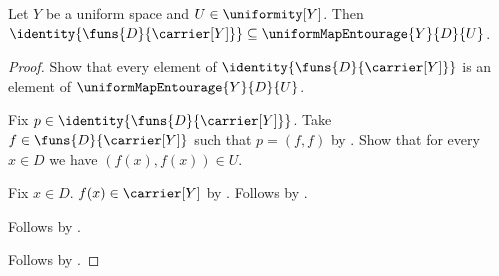\begin{proposition}\label{uniform_map_entourage_diagonal}
    Let $Y$ be a uniform space and $U\in\uniformity[Y]$.
    Then $\identity{\funs{D}{\carrier[Y]}}\subseteq
        \uniformMapEntourage{Y}{D}{U}$.
\end{proposition}
\begin{proof}
    Show that every element of $\identity{\funs{D}{\carrier[Y]}}$ is an
        element of $\uniformMapEntourage{Y}{D}{U}$.
    \begin{subproof}
        Fix $p\in\identity{\funs{D}{\carrier[Y]}}$.
        Take $f\in\funs{D}{\carrier[Y]}$ such that $p=(f,f)$
            by .
        Show that for every $x\in D$ we have $(f(x),f(x))\in U$.
        \begin{subproof}
            Fix $x\in D$.
            $f(x)\in\carrier[Y]$ by .
            Follows by .
        \end{subproof}
        Follows by .
    \end{subproof}
    Follows by .
\end{proof}

